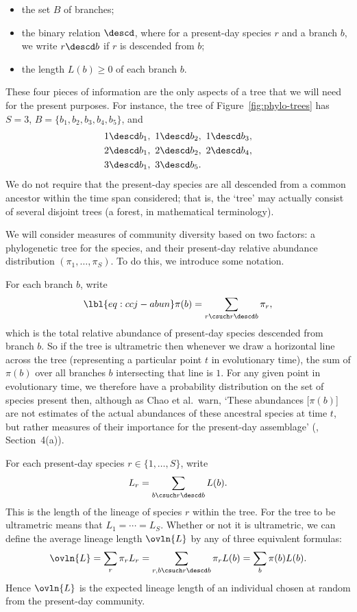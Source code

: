 \begin{example}
\begin{itemize}
\item
the set $B$ of branches;

\item
the binary relation $\descd$, where for a present-day species $r$
and a branch $b$, we write $r \descd b$ if $r$ is descended from $b$;

\item
the length $L(b) \geq 0$ of each branch $b$.
\end{itemize}
% 
These four pieces of information are the only aspects of a tree that we
will need for the present purposes.  For instance, the tree of
Figure~\ref{fig:phylo-trees} has $S = 3$, $B = \{b_1, b_2,
b_3, b_4, b_5\}$, and
% 
\begin{align*}
&1 \descd b_1, \ 1 \descd b_2, \ 1 \descd b_3, \\
&2 \descd b_1, \ 2 \descd b_2, \ 2 \descd b_4, \\
&3 \descd b_1, \ 3 \descd b_5.
\end{align*}
% 
We do not require that the present-day species are all descended from a
common ancestor within the time span considered; that is, the `tree' may
actually consist of several disjoint trees (a
forest, in mathematical terminology).

We will consider measures of community diversity based on two factors: a
phylogenetic tree for the species, and their present-day relative abundance
distribution $(\pi_1, \ldots, \pi_S)$.  To do this, we introduce some
notation.

For each branch $b$, write
% 
\begin{equation}
\lbl{eq:ccj-abun}
\pi(b) = \sum_{r \csuch r \descd b} \pi_r,
\end{equation}
% 
which is the total relative abundance of present-day species descended from
branch $b$.  So if the tree is ultrametric then whenever we draw a
horizontal line across the tree (representing a particular point $t$ in
evolutionary time), the sum of $\pi(b)$ over all branches $b$ intersecting
that line is $1$.  For any given point in evolutionary time, we therefore
have a probability distribution on the set of species present then,
although as Chao%
%
% 
et al.\ warn, `These abundances [$\pi(b)$] are not estimates of the actual
abundances of these ancestral species at time $t$, but rather measures of
their importance for the present-day assemblage' (\cite{CCJ},
Section~4(a)).

For each present-day species $r \in \{1, \ldots, S\}$, write
\[
L_r = \sum_{b \csuch r \descd b} L(b).
\]
This is the length of the lineage of species $r$ within the tree.  For the
tree to be ultrametric means that $L_1 = \cdots = L_S$.  Whether or not it
is ultrametric, we can define the average lineage length $\ovln{L}$ by any
of three equivalent formulas:
\[
\ovln{L}
=
\sum_r \pi_r L_r
=
\sum_{r, b \csuch r \descd b} \pi_r L(b)
=
\sum_b \pi(b) L(b).
\]
Hence $\ovln{L}$ is the expected lineage length of an individual chosen at
random from the present-day community.  


\end{example}
